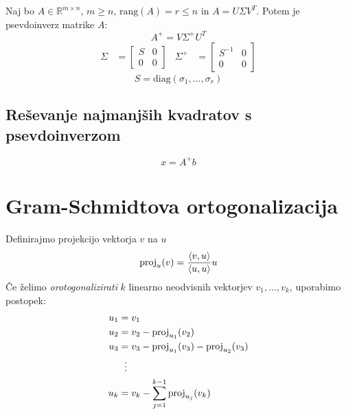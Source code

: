 \begin{multicols}{4}
Naj bo $A \in \mathbb{R}^{m\times n}$, $m \geq n$, $\text{rang}(A) = r \leq n$ in $A = U \Sigma V^T$.
Potem je psevdoinverz matrike $A$:
\[A^+ = V \Sigma^+ U^T\]
\begin{align*}
	\Sigma &= \begin{bmatrix}
		S & 0 \\ 0 & 0
	\end{bmatrix} &
	\Sigma^+ &= \begin{bmatrix}
		S^{-1} & 0 \\ 0 & 0
	\end{bmatrix}
\end{align*}
\[ S = \text{diag}(\sigma_1, \dots, \sigma_r) \]

\subsection{Reševanje najmanjših kvadratov s psevdoinverzom}
\[ x = A^+ b\]

\section{Gram-Schmidtova ortogonalizacija}
Definirajmo projekcijo vektorja $v$ na $u$
\[\textmd{proj}_u(v) = \frac{\langle v,u \rangle}{\langle u,u \rangle}u\]
Če želimo \emph{orotogonalizirati} $k$ linearno neodvisnih vektorjev $v_1, ..., v_k$, uporabimo postopek:
\begin{equation*}
    \begin{aligned}
    u_1 &= v_1 \\
    u_2 &= v_2 - \textmd{proj}_{u_1}(v_2) \\
    u_3 &= v_3 - \textmd{proj}_{u_1}(v_3) - \textmd{proj}_{u_2}(v_3) \\
    &\; \ \vdots \\
    u_k &= v_k - \sum_{j=1}^{k-1} \textmd{proj}_{u_j}(v_k)
    \end{aligned}
\end{equation*}
\end{multicols}
